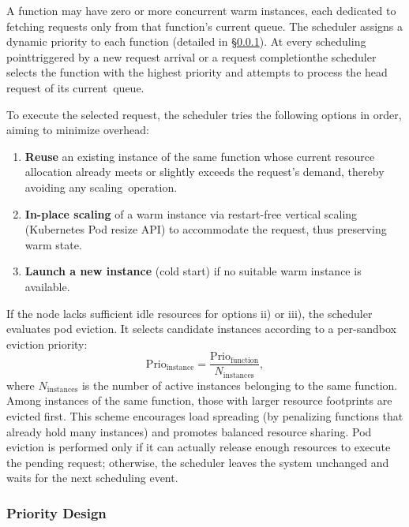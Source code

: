  A function may have
zero or more concurrent warm instances, each dedicated to fetching requests only
from that function's current queue. The scheduler assigns a dynamic priority to 
each function (detailed in \S\ref{subsec:priority-design}). At every scheduling 
point\textemdash triggered by a new request arrival or a request completion\textemdash the scheduler selects 
the function with the highest priority and attempts to process the head request of 
its current~queue.

 To execute the selected request, the scheduler 
tries the following options in order, aiming to minimize overhead:

\begin{enumerate}[label=\roman*)]
    \item \textbf{Reuse} an existing instance of the same function whose current 
    resource allocation already meets or slightly exceeds the request's demand, 
    thereby avoiding any scaling~operation.
    
    \item \textbf{In-place scaling} of a warm instance via restart-free vertical 
    scaling (Kubernetes Pod resize API) to accommodate the request, thus preserving 
    warm state.

    \item \textbf{Launch a new instance} (cold start) if no suitable warm instance 
    is available.
\end{enumerate}

If the node lacks sufficient idle resources for options ii) or iii), the scheduler 
evaluates pod eviction. It selects candidate instances according to a per-sandbox 
eviction priority:
\[
\text{Prio}_{\text{instance}} = \frac{\text{Prio}_{\text{function}}}{N_{\text{instances}}},
\]
where \(N_{\text{instances}}\) is the number of active instances belonging to 
the same function. Among instances of the same function, those with larger resource 
footprints are evicted first. This scheme encourages load spreading (by penalizing 
functions that already hold many instances) and promotes balanced resource sharing. 
Pod eviction is performed only if it can actually release enough resources to execute 
the pending request; otherwise, the scheduler leaves the system unchanged and waits 
for the next scheduling event.

\subsubsection{Priority Design}
\label{subsec:priority-design}

